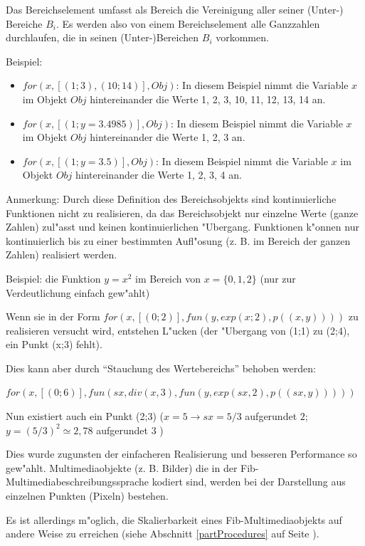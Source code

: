 Das Bereichselement umfasst als Bereich die Vereinigung aller seiner (Unter-) Bereiche $B_{i}$. Es werden also von einem Bereichselement alle Ganzzahlen durchlaufen, die in seinen (Unter-)Bereichen $B_{i}$ vorkommen.

\bigskip\noindent
Beispiel:
\begin{itemize}
 \item $for(x,[(1;3),(10;14)],Obj)$: In diesem Beispiel nimmt die Variable $x$ im Objekt $Obj$ hintereinander die Werte 1, 2, 3, 10, 11, 12, 13, 14 an.
 \item $for(x,[(1;y=3.4985)],Obj)$: In diesem Beispiel nimmt die Variable $x$ im Objekt $Obj$ hintereinander die Werte 1, 2, 3 an.
 \item $for(x,[(1;y=3.5)],Obj)$: In diesem Beispiel nimmt die Variable $x$ im Objekt $Obj$ hintereinander die Werte 1, 2, 3, 4 an.
\end{itemize}


\bigskip\noindent
Anmerkung:
Durch diese Definition des Bereichsobjekts sind kontinuierliche Funktionen nicht zu realisieren, da das Bereichsobjekt nur einzelne Werte (ganze Zahlen) zul"asst und keinen kontinuierlichen "Ubergang. Funktionen k"onnen nur kontinuierlich bis zu einer bestimmten Aufl"osung (z. B. im Bereich der ganzen Zahlen) realisiert werden.

\bigskip\noindent
Beispiel:
die Funktion $y = x^{2}$ im Bereich von $x = \{0, 1, 2\}$ (nur zur Verdeutlichung einfach gew"ahlt)

\bigskip\noindent
Wenn sie in der Form
$for(x,[(0;2)], fun(y,exp(x;2), p((x,y))))$
zu realisieren versucht wird, entstehen L"ucken (der "Ubergang von (1;1) zu (2;4), ein Punkt (x;3) fehlt).

\bigskip\noindent
Dies kann aber durch ``Stauchung des Wertebereichs'' behoben werden:

$for(x,[(0;6)], fun(sx, div(x, 3), fun(y,exp(sx, 2), p((sx, y)))))$

Nun existiert auch ein Punkt (2;3) ($x = 5 \rightarrow sx = 5/3$ aufgerundet $2$; $y = (5/3)^2 \simeq 2{,}78$ aufgerundet $3$ )

\bigskip\noindent
Dies wurde zugunsten der einfacheren Realisierung und besseren Performance so gew"ahlt.
Multimediaobjekte (z. B. Bilder) die in der Fib-Multi\-media\-beschrei\-bungs\-sprache kodiert sind, werden bei der Darstellung aus einzelnen Punkten (Pixeln) bestehen.

Es ist allerdings m"oglich, die Skalierbarkeit eines Fib-Multimediaobjekts auf andere Weise zu erreichen (siehe Abschnitt \ref{partProcedures} auf Seite \pageref{partProcedures}).

